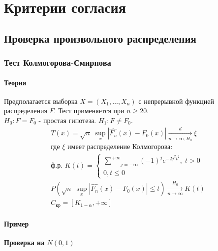 \chapter{Критерии согласия}\label{cha:compl}

\section{Проверка произвольного распределения}\label{cha:compl/sec:nenorm}

\subsection{Тест Колмогорова-Смирнова}\label{cha:compl/sec:nenorm/subsec:kolmsmirn}

\subsubsection*{Теория}\label{cha:compl/sec:nenorm/subsec:kolmsmirn/subsubsection:theory}

Предполагается выборка $X = (X_1, \dots, X_n)$ с непрерывной функцией распределения $F$. Тест применяется при $n \ge 20$.\\
$H_0: F = F_0$ - простая гипотеза. $H_1: F \not = F_0$.\\
$$\begin{gathered}
	T(x) = \sqrt{n} \; \underset{x}{\sup} |\hat{F_n}(x) - F_0 (x)| \xrightarrow[n\to \infty, H_0]{d} \xi \\
	\text{где } \xi \text{ имеет распределение Колмогорова:} \\
	\text{ф.р. } K(t) = \begin{cases}
		\underset{j=-\infty}{\overset{+\infty}{\sum}}(-1)^j e^{-2 j^2 t^2}, \; t >0 \\
		0, t \le 0
	\end{cases}\\
	P(\sqrt{n}\; \underset{x}{\sup} |\hat{F_n}(x) - F_0 (x)| \le t) \xrightarrow[n\to \infty]{H_0} K(t) \\
	C_{\text{кр}} = [K_{1-\alpha}, +\infty]
\end{gathered}$$

\subsubsection*{Пример}\label{cha:compl/sec:nenorm/subsec:kolmsmirn/subsubsection:prob}

\textbf{Проверка на $N(0,1)$}

